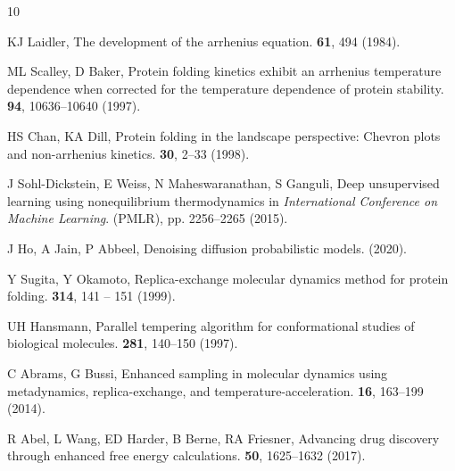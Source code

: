 \documentclass[9pt,twocolumn,twoside]{pnas-new}
\begin{document}
\showacknow{} %

\begin{thebibliography}{10}

KJ Laidler, The development of the arrhenius equation.
  \textbf{61}, 494 (1984).

ML Scalley, D Baker, Protein folding kinetics exhibit an arrhenius temperature
  dependence when corrected for the temperature dependence of protein
  stability.
 \textbf{94}, 10636--10640 (1997).

HS Chan, KA Dill, Protein folding in the landscape perspective: Chevron plots
  and non-arrhenius kinetics.
 \textbf{30}, 2--33 (1998).

J Sohl-Dickstein, E Weiss, N Maheswaranathan, S Ganguli, Deep unsupervised
  learning using nonequilibrium thermodynamics in {\em International Conference
  on Machine Learning}.
\newblock (PMLR), pp. 2256--2265 (2015).

J Ho, A Jain, P Abbeel, Denoising diffusion probabilistic models.
 (2020).

Y Sugita, Y Okamoto, Replica-exchange molecular dynamics method for protein
  folding.
 \textbf{314},
  141 -- 151 (1999).

UH Hansmann, Parallel tempering algorithm for conformational studies of
  biological molecules.
 \textbf{281},
  140--150 (1997).

C Abrams, G Bussi, Enhanced sampling in molecular dynamics using metadynamics,
  replica-exchange, and temperature-acceleration.
 \textbf{16}, 163--199 (2014).

R Abel, L Wang, ED Harder, B Berne, RA Friesner, Advancing drug discovery
  through enhanced free energy calculations.
  \textbf{50}, 1625--1632 (2017).


\end{thebibliography}
\end{document}
